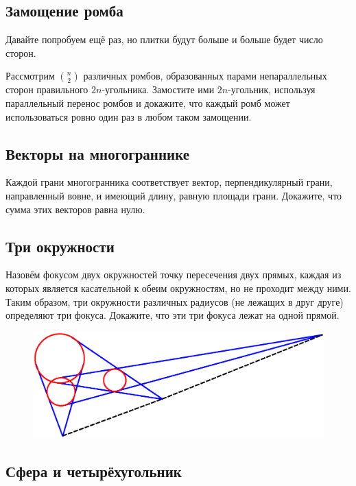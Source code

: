 \subsection*{Замощение ромба}%

Давайте попробуем ещё раз, но плитки будут больше и больше будет число сторон.

Рассмотрим $\binom n2$ различных ромбов, образованных парами непараллельных сторон правильного $2n$-угольника.
Замостите ими $2n$-угольник, используя параллельный перенос ромбов
и докажите, что каждый ромб может использоваться ровно один раз в любом таком замощении.

\subsection*{Векторы на многограннике}%

Каждой грани многогранника соответствует вектор, перпендикулярный грани, направленный вовне, и имеющий длину, равную площади грани.
Докажите, что сумма этих векторов равна нулю.

\subsection*{Три окружности}%

Назовём фокусом двух окружностей точку пересечения двух прямых, каждая из которых является касательной к обеим окружностям, но не проходит между ними.
Таким образом, три окружности различных радиусов (не лежащих в друг друге)
определяют три фокуса.
Докажите, что эти три фокуса лежат на одной прямой.

\begin{figure}[h!]
\centering
\includegraphics[scale=0.5]{Figs/Geometry/foci}
\end{figure} 

\subsection*{Сфера и четырёхугольник}%

